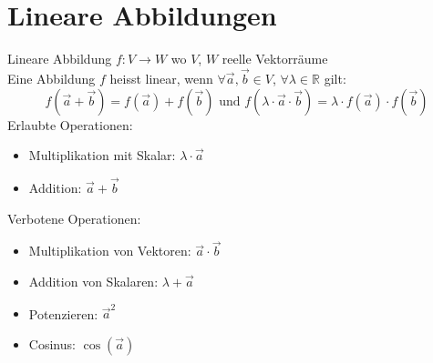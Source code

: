 

\section{Lineare Abbildungen}


\begin{definition}{Lineare Abbildung} $f: V \rightarrow W$ wo $V$, $W$ reelle Vektorräume\\
    Eine Abbildung $f$ heisst linear, wenn $\forall \overrightarrow{a}, \overrightarrow{b} \in V$, $\forall \lambda \in \mathbb{R}$ gilt:
    $$
    f(\overrightarrow{a} + \overrightarrow{b}) = f(\overrightarrow{a}) + f(\overrightarrow{b})
    \text{ und }
    f(\lambda \cdot \overrightarrow{a} \cdot \vec{b}) = \lambda \cdot f(\overrightarrow{a}) \cdot f(\vec{b})
    $$
    Erlaubte Operationen:\\
    \begin{minipage}{0.6\linewidth}
        \begin{itemize}
            \item Multiplikation mit Skalar: $\lambda \cdot \vec{a}$
        \end{itemize}
    \end{minipage}
    \begin{minipage}{0.3\linewidth}
        \begin{itemize}
            \item Addition: $\vec{a} + \vec{b}$
        \end{itemize}
    \end{minipage}
    
    \vspace{1mm}

    Verbotene Operationen:\\
    \begin{minipage}{0.6\linewidth}
        \begin{itemize}
            \item Multiplikation von Vektoren: $\vec{a} \cdot \vec{b}$
            \item Addition von Skalaren: $\lambda + \vec{a}$
        \end{itemize}
    \end{minipage}
    \begin{minipage}{0.3\linewidth}
        \begin{itemize}
            \item Potenzieren: $\vec{a}^2$
            \item Cosinus: $\cos(\vec{a})$
        \end{itemize}
    \end{minipage}
\end{definition}

